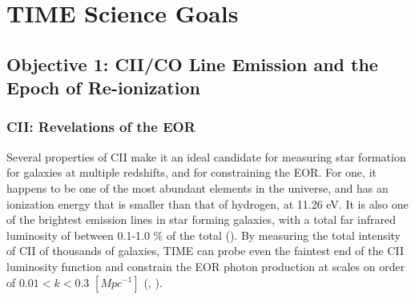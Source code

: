\documentclass[manuscript]{aastex}
\begin{document}

\section{\textbf{TIME Science Goals}}
\subsection{\textbf{Objective 1: CII/CO Line Emission and the Epoch of Re-ionization}}


\subsubsection{\textbf{CII: Revelations of the EOR}}
Several properties of CII make it an ideal candidate for measuring star formation for galaxies at multiple redshifts, and for constraining the EOR. For one, it happens to be one of the most abundant elements in the universe, and has an ionization energy that is smaller than that of hydrogen, at 11.26 eV. It is also one of the brightest emission lines in star forming galaxies, with a total far infrared luminosity of between 0.1-1.0 \% of the total (\cite{Stacey1991}). By measuring the total intensity of CII of thousands of galaxies, TIME can probe even the faintest end of the CII luminosity function and constrain the EOR photon production at scales on order of  $0.01 < k < 0.3$  $[Mpc^{-1}]$  (\cite{Gong2012}, \cite{Crites2014}). 
\end{document}

